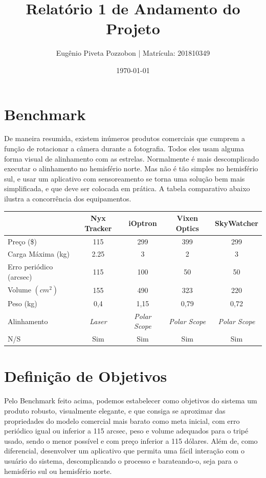 \documentclass[a4paper, 12pt]{article}
\title{Relatório 1 de Andamento do Projeto}
\author{Eugênio Piveta Pozzobon | Matrícula: 201810349}
\date{\today}
\begin{document}
\maketitle
\newpage
\tableofcontents
\newpage
\section{Benchmark}

De maneira resumida, existem inúmeros produtos comerciais que cumprem a função de rotacionar a câmera durante a fotografia. Todos eles usam alguma forma visual de alinhamento com as estrelas. Normalmente é mais descomplicado executar o alinhamento no hemisfério norte. Mas não é tão simples no hemisfério sul, e usar um aplicativo com sensoreamento se torna uma solução bem mais simplificada, e que deve ser colocada em prática. A tabela comparativo abaixo ilustra a concorrência dos equipamentos. 

\begin{table}[htb]
	\begin{tabular}{l|cccc}
	 & Nyx Tracker & iOptron & Vixen Optics & SkyWatcher \\ \hline
	Preço (\$) & 115 & 299 & 399 & 299 \\\hline
	Carga Máxima (kg) & 2.25 & 3 & 2 & 3 \\\hline
	Erro periódico (arcsec) & 115 & 100 & 50 & 50 \\\hline
	Volume $ (cm^2) $ & 155 & 490 & 323 & 220 \\\hline
	Peso (kg) & 0,4 & 1,15 & 0,79 & 0,72 \\\hline
	Alinhamento & \textit{Laser} & \textit{Polar Scope} & \textit{Polar Scope} & \textit{Polar Scope} \\\hline
	N/S & Sim & Sim & Sim & Sim \\
\end{tabular}
\end{table}

\section{Definição de Objetivos}
Pelo Benchmark feito acima, podemos estabelecer como objetivos do sistema um produto robusto, visualmente elegante, e que consiga se aproximar das propriedades do modelo comercial mais barato como meta inicial, com erro periódico igual ou inferior a 115 arcsec, peso e volume adequados para o tripé usado, sendo o menor possível e com preço inferior a 115 dólares. Além de, como diferencial, desenvolver um aplicativo que permita uma fácil interação com o usuário do sistema, descomplicando o processo e barateando-o, seja para o hemisfério sul ou hemisfério norte.
\end{document}
